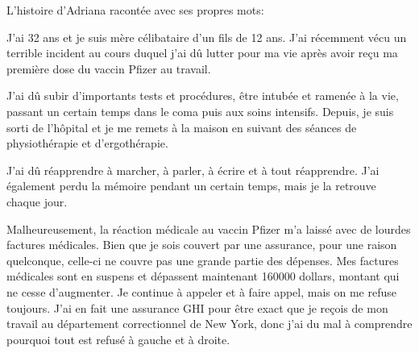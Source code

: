 L'histoire d'Adriana racontée avec ses propres mots:

J'ai 32 ans et je suis mère célibataire d'un fils de 12 ans. J'ai récemment vécu
un terrible incident au cours duquel j'ai dû lutter pour ma vie après avoir reçu
ma première dose du vaccin Pfizer au travail.

J'ai dû subir d'importants tests et procédures, être intubée et ramenée à la
vie, passant un certain temps dans le coma puis aux soins intensifs. Depuis, je
suis sorti de l'hôpital et je me remets à la maison en suivant des séances de
physiothérapie et d'ergothérapie.

J'ai dû réapprendre à marcher, à parler, à écrire et à tout réapprendre. J'ai
également perdu la mémoire pendant un certain temps, mais je la retrouve chaque
jour.

Malheureusement, la réaction médicale au vaccin Pfizer m'a laissé avec de
lourdes factures médicales. Bien que je sois couvert par une assurance, pour une
raison quelconque, celle-ci ne couvre pas une grande partie des dépenses. Mes
factures médicales sont en suspens et dépassent maintenant 160000 dollars,
montant qui ne cesse d'augmenter. Je continue à appeler et à faire appel, mais
on me refuse toujours. J'ai en fait une assurance GHI pour être exact que je
reçois de mon travail au département correctionnel de New York, donc j'ai du mal
à comprendre pourquoi tout est refusé à gauche et à droite.


